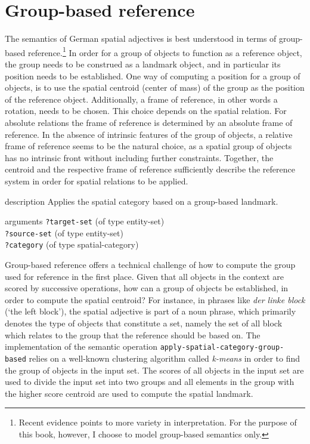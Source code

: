 \section{Group-based reference}
The semantics of German spatial adjectives is best understood in terms of 
group-based reference.\footnote{Recent evidence \citep{moratz2006spatial} 
points to more variety in interpretation. For the purpose of this book, however,
I choose to model group-based semantics only.} In order for a group of objects 
to function as a reference object, the group needs to be construed as a landmark object, and in
particular its position needs to be established. One way of computing a position
for a group of objects, is to use the spatial centroid (center of mass) of the group 
as the position of the reference object. Additionally, a frame of reference, in other words
a rotation, needs to be chosen. This choice depends on the spatial relation. For
absolute relations the frame of reference is determined by an absolute 
frame of reference. In the absence of intrinsic features of the group of objects,
a relative frame of reference seems to be the natural choice, as a spatial group
of objects has no intrinsic front without including further constraints. 
Together, the centroid and the respective frame of reference sufficiently 
describe the reference system in order for spatial 
relations to be applied.

\begin{explanation}{description}
Applies the spatial category based on a group-based landmark. 
\end{explanation}
\begin{explanation}{arguments}
{\footnotesize\verb+?target-set+} (of type entity-set) \\
{\footnotesize\verb+?source-set+} (of type entity-set) \\
{\footnotesize\verb+?category+} (of type spatial-category)
\vspace{0.3cm}
\end{explanation}

Group-based reference offers a technical challenge of how to 
compute the group used for reference in the first place. Given that
all objects in the context are scored by successive operations, how can
a group of objects be established, in order to compute the
spatial centroid? For instance, in phrases like \textit{der linke block} (`the left block'),
the spatial adjective is part of a noun phrase, which primarily denotes the type of
objects that constitute a set, namely the set of all block which relates to 
the group that the reference should be based on.
The implementation of the semantic operation 
{\footnotesize\tt apply-spatial-category-group-based} relies on a well-known clustering algorithm
called \emph{k-means} \citep{lloyd1982least} in order to find the group 
of objects in the input set. The scores of all objects in the input set 
are used to divide the input set into two groups and all elements 
in the group with the higher score centroid are used to compute 
the spatial landmark. 

